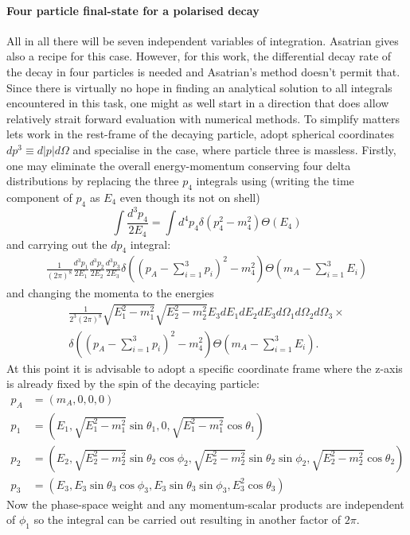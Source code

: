 \paragraph{Four particle final-state for a polarised decay}
All in all there will be seven independent variables of integration. Asatrian gives also a recipe for this case. However, for this work, the differential decay rate of the decay in four particles is needed and Asatrian's method doesn't permit that.
Since there is virtually no hope in finding an analytical solution to all integrals encountered in this task, one might as well start in a direction that does allow relatively strait forward evaluation with numerical methods. 
To simplify matters lets work in the rest-frame of the decaying particle, adopt spherical coordinates $dp^3 \equiv d|p|d\Omega$ and specialise in the case, where particle three is massless.
Firstly, one may eliminate the overall energy-momentum conserving four delta distributions by replacing the three $p_4$ integrals using (writing the time component of $p_4$ as $E_4$ even though its not on shell)
\begin{equation}
\int\frac{d^3p_4}{2E_4}=\int d^4p_4\delta(p_4^2-m_4^2)\Theta(E_4)
\label{eq:AppOffShell}
\end{equation}
and carrying out the $dp_4$ integral:
\begin{align*}
\frac{1}{(2\pi)^8} \frac{d^3p_1}{2E_1}\frac{d^3p_2}{2E_2}\frac{d^3p_3}{2E_3}\delta\left((p_A-\sum_{i=1}^3p_i)^2-m_4^2\right)\Theta(m_A-\sum_{i=1}^3E_i)
\end{align*}
and changing the momenta to the energies
\begin{align*}
\frac{1}{2^3(2\pi)^8}\sqrt{E_1^2-m_1^2}\sqrt{E_2^2-m_2^2}E_3dE_1dE_2dE_3d\Omega_1d\Omega_2d\Omega_3\times \\ \delta\left((p_A-\sum_{i=1}^3p_i)^2-m_4^2\right)\Theta(m_A-\sum_{i=1}^3E_i).
\end{align*}
At this point it is advisable to adopt a specific coordinate frame where the z-axis is already fixed by the spin of the decaying particle:
\begin{align}
p_A&=(m_A,0,0,0)\\
p_1&=(E_1,\sqrt{E_1^2-m_1^2}\sin\theta_1,0,\sqrt{E_1^2-m_1^2}\cos\theta_1)\\
p_2&=(E_2,\sqrt{E_2^2-m_2^2}\sin\theta_2\cos\phi_2,\sqrt{E_2^2-m_2^2}\sin\theta_2\sin\phi_2,\sqrt{E_2^2-m_2^2}\cos\theta_2)\\
p_3&=(E_3,E_3\sin\theta_3\cos\phi_3,E_3\sin\theta_3\sin\phi_3,E_3^2\cos\theta_3)
\label{eq:momenta}
\end{align}
Now the phase-space weight and any momentum-scalar products are independent of $\phi_1$ so the integral can be carried out resulting in another factor of $2\pi$.

